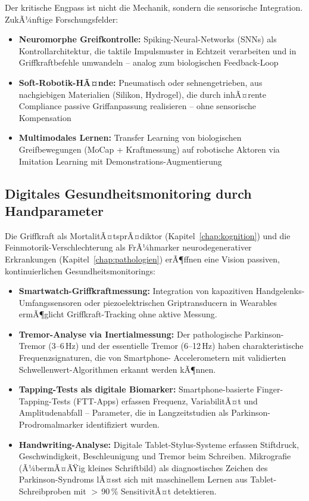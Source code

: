 ﻿\documentclass[12pt,a4paper]{report}
\theoremstyle{plain}
\theoremstyle{definition}
\theoremstyle{remark}
\begin{document}
Der kritische Engpass ist nicht die Mechanik, sondern die sensorische
Integration. ZukÃ¼nftige Forschungsfelder:

\begin{itemize}
\item \textbf{Neuromorphe Greifkontrolle:} Spiking-Neural-Networks
  (SNNs) als Kontrollarchitektur, die taktile Impulsmuster in
  Echtzeit verarbeiten und in Griffkraftbefehle umwandeln -- analog
  zum biologischen Feedback-Loop
\item \textbf{Soft-Robotik-HÃ¤nde:} Pneumatisch oder sehnengetrieben,
  aus nachgiebigen Materialien (Silikon, Hydrogel), die durch
  inhÃ¤rente Compliance passive Griffanpassung realisieren -- ohne
  sensorische Kompensation
\item \textbf{Multimodales Lernen:} Transfer Learning von biologischen
  Greifbewegungen (MoCap + Kraftmessung) auf robotische Aktoren via
  Imitation Learning mit Demonstrations-Augmentierung
\end{itemize}

\subsection{Digitales Gesundheitsmonitoring durch Handparameter}

Die Griffkraft als MortalitÃ¤tsprÃ¤diktor (Kapitel~\ref{chap:kognition})
und die Feinmotorik-Verschlechterung als FrÃ¼hmarker neurodegenerativer
Erkrankungen (Kapitel~\ref{chap:pathologien}) erÃ¶ffnen eine Vision
passiven, kontinuierlichen Gesundheitsmonitorings:

\begin{itemize}
\item \textbf{Smartwatch-Griffkraftmessung:} Integration von
  kapazitiven Handgelenks-Umfangssensoren oder piezoelektrischen
  Griptransducern in Wearables ermÃ¶glicht Griffkraft-Tracking ohne
  aktive Messung.
\item \textbf{Tremor-Analyse via Inertialmessung:} Der pathologische
  Parkinson-Tremor (3--6\,Hz) und der essentielle Tremor (6--12\,Hz)
  haben charakteristische Frequenzsignaturen, die von Smartphone-
  Accelerometern mit validierten Schwellenwert-Algorithmen erkannt
  werden kÃ¶nnen.
\item \textbf{Tapping-Tests als digitale Biomarker:} Smartphone-basierte
  Finger-Tapping-Tests (FTT-Apps) erfassen Frequenz, VariabilitÃ¤t
  und Amplitudenabfall -- Parameter, die in Langzeitstudien als
  Parkinson-Prodromalmarker identifiziert wurden.
\item \textbf{Handwriting-Analyse:} Digitale Tablet-Stylus-Systeme
  erfassen Stiftdruck, Geschwindigkeit, Beschleunigung und Tremor
  beim Schreiben. Mikrografie (Ã¼bermÃ¤ÃŸig kleines Schriftbild) als
  diagnostisches Zeichen des Parkinson-Syndroms lÃ¤sst sich mit
  maschinellem Lernen aus Tablet-Schreibproben mit $>$\,90\,\%
  SensitivitÃ¤t detektieren.
\end{itemize}
\end{document}
